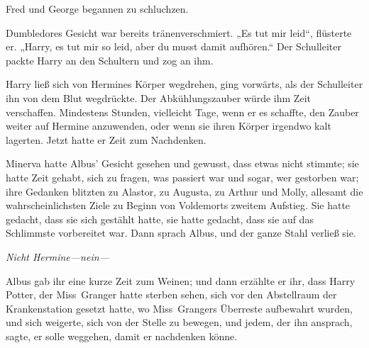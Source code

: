 Fred und George begannen zu schluchzen.

Dumbledores Gesicht war bereits tränenverschmiert. „Es tut mir leid“, flüsterte er. „Harry, es tut mir so leid, aber du musst damit aufhören.“ Der Schulleiter packte Harry an den Schultern und zog an ihm.


Harry ließ sich von Hermines Körper wegdrehen, ging vorwärts, als der Schulleiter ihn von dem Blut wegdrückte. Der Abkühlungszauber würde ihm Zeit verschaffen. Mindestens Stunden, vielleicht Tage, wenn er es schaffte, den Zauber weiter auf Hermine anzuwenden, oder wenn sie ihren Körper irgendwo kalt lagerten. Jetzt hatte er Zeit zum Nachdenken.

\later


Minerva hatte Albus' Gesicht gesehen und gewusst, dass etwas nicht stimmte; sie hatte Zeit gehabt, sich zu fragen, was passiert war und sogar, wer gestorben war; ihre Gedanken blitzten zu Alastor, zu Augusta, zu Arthur und Molly, allesamt die wahrscheinlichsten Ziele zu Beginn von Voldemorts zweitem Aufstieg. Sie hatte gedacht, dass sie sich gestählt hatte, sie hatte gedacht, dass sie auf das Schlimmste vorbereitet war. Dann sprach Albus, und der ganze Stahl verließ sie.

\emph{Nicht Hermine—nein—}

Albus gab ihr eine kurze Zeit zum Weinen; und dann erzählte er ihr, dass Harry Potter, der Miss~Granger hatte sterben sehen, sich vor den Abstellraum der Krankenstation gesetzt hatte, wo Miss~Grangers Überreste aufbewahrt wurden, und sich weigerte, sich von der Stelle zu bewegen, und jedem, der ihn ansprach, sagte, er solle weggehen, damit er nachdenken könne.

